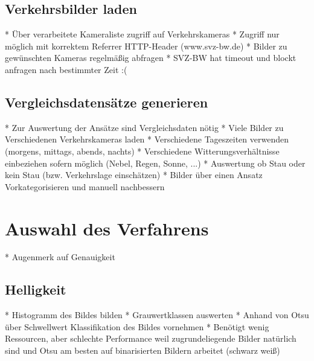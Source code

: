 \subsection{Verkehrsbilder laden}
* Über verarbeitete Kameraliste zugriff auf Verkehrskameras\newline
* Zugriff nur möglich mit korrektem Referrer HTTP-Header (www.svz-bw.de)\newline
* Bilder zu gewünschten Kameras regelmäßig abfragen\newline
* SVZ-BW hat timeout und blockt anfragen nach bestimmter Zeit :(\newline

\subsection{Vergleichsdatensätze generieren}
* Zur Auswertung der Ansätze sind Vergleichsdaten nötig\newline
* Viele Bilder zu Verschiedenen Verkehrskameras laden\newline
* Verschiedene Tageszeiten verwenden (morgens, mittags, abends, nachts)\newline
* Verschiedene Witterungsverhältnisse einbeziehen sofern möglich (Nebel, Regen, Sonne, ...)\newline
* Auswertung ob Stau oder kein Stau (bzw. Verkehrslage einschätzen)\newline
* Bilder über einen Ansatz Vorkategorisieren und manuell nachbessern\newline

\section{Auswahl des Verfahrens}
* Augenmerk auf Genauigkeit

\subsection{Helligkeit}
* Histogramm des Bildes bilden\newline
* Grauwertklassen auswerten\newline
* Anhand von Otsu über Schwellwert Klassifikation des Bildes vornehmen\newline
* Benötigt wenig Ressourcen, aber schlechte Performance weil zugrundeliegende Bilder \newline
	natürlich sind und Otsu am besten auf binarisierten Bildern arbeitet (schwarz weiß)
	
